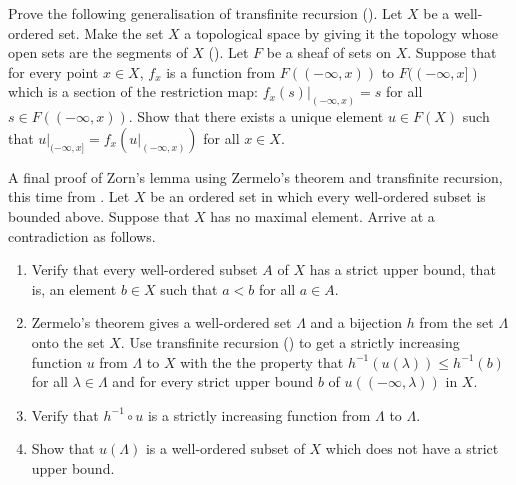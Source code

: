 \documentclass{article}
\begin{document}
\begin{exercise}
  \label{exe:x9ewqbv6}
  Prove the following generalisation of transfinite recursion
  ().  Let \(X\) be a well-ordered set.  Make the
  set \(X\) a topological space by giving it the topology whose open
  sets are the segments of \(X\) ().  Let \(F\) be
  a sheaf of sets on \(X\).  Suppose that for every point \(x \in X\),
  \(f_x\) is a function from \(F((-\infty, x))\) to
  \(F((-\infty, x])\) which is a section of the restriction map:
  \(f_x(s) \vert_{(-\infty, x)} = s\) for all
  \(s \in F((-\infty, x))\).  Show that there exists a unique element
  \(u \in F(X)\) such that
  \(u \vert_{(-\infty, x]} = f_x(u \vert_{(-\infty, x)})\) for all
  \(x \in X\).
\end{exercise}

\begin{exercise}
  \label{exe:k8tmok20}
  A final proof of Zorn's lemma using Zermelo's theorem and
  transfinite recursion, this time from \textcite[Chapter~XVI, \S4,
  Theorem~1]{bib:embpmrus}.  Let \(X\) be an ordered set in which
  every well-ordered subset is bounded above.  Suppose that \(X\) has
  no maximal element.  Arrive at a contradiction as follows.
  \begin{enumerate}
  \item Verify that every well-ordered subset \(A\) of \(X\) has a
    strict upper bound, that is, an element \(b \in X\) such that
    \(a < b\) for all \(a \in A\).
  \item Zermelo's theorem gives a well-ordered set \(\Lambda\) and a
    bijection \(h\) from the set \(\Lambda\) onto the set \(X\).  Use
    transfinite recursion () to get a strictly
    increasing function \(u\) from \(\Lambda\) to \(X\) with the the
    property that \(h^{-1}(u(\lambda)) \leq h^{-1}(b)\) for all
    \(\lambda \in \Lambda\) and for every strict upper bound \(b\) of
    \(u((-\infty, \lambda))\) in \(X\).
  \item Verify that \(h^{-1} \circ u\) is a strictly increasing
    function from \(\Lambda\) to \(\Lambda\).
  \item Show that \(u(\Lambda)\) is a well-ordered subset of \(X\)
    which does not have a strict upper bound.
  \end{enumerate}
\end{exercise}
\end{document}

